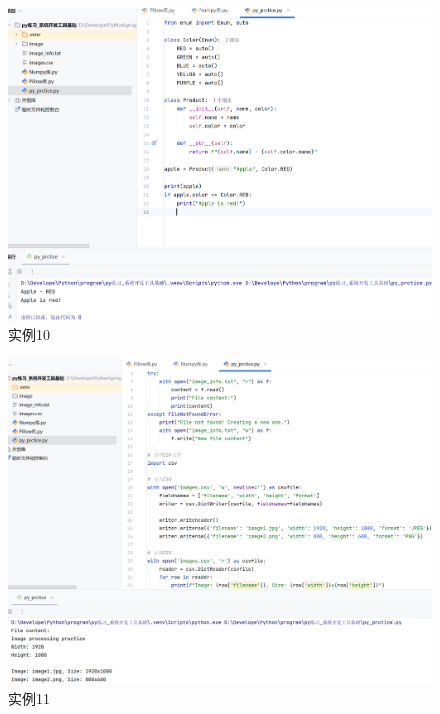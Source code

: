\documentclass[cn,12pt]{report}
\begin{document}
{      \begin{figure}[htbp]
    \centering
    \includegraphics[width=1\textwidth]{image/11.png}
    \caption{实例10}
  \end{figure}
\FloatBarrier
   
      \begin{figure}[htbp]
    \centering
    \includegraphics[width=1\textwidth]{image/8.png}
    \caption{实例11}
  \end{figure}
\FloatBarrier
   
}
\end{document}
